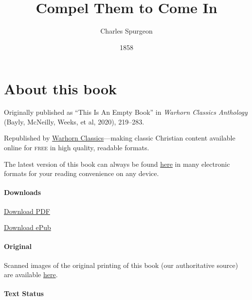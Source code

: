 \documentclass[
]{book}
\title{Compel Them to Come In}
\author{Charles Spurgeon}
\date{1858}
\begin{document}
\maketitle

\mainmatter
{}

{
\setcounter{tocdepth}{1}
\tableofcontents
}
\hypertarget{about-this-book}{%
\chapter*{About this book}\label{about-this-book}}

Originally published as ``This Is An Empty Book'' in \emph{Warhorn Classics Anthology} (Bayly, McNeilly, Weeks, et al, 2020), 219--283.

Republished by \href{https://classics.warhornmedia.com/}{Warhorn Classics}---making classic Christian content available online for \textsc{free} in high quality, readable formats.

The latest version of this book can always be found \href{https://warhornmedia.github.io/spurgeon-compel-them-to-come-in/}{here} in many electronic formats for your reading convenience on any device.

\hypertarget{downloads}{%
\subsubsection*{Downloads}\label{downloads}}

\href{https://warhornmedia.github.io/spurgeon-compel-them-to-come-in//Spurgeon-Compel_Them_to_Come_In.pdf}{Download PDF}

\href{https://warhornmedia.github.io/spurgeon-compel-them-to-come-in//Spurgeon-Compel_Them_to_Come_In.epub}{Download ePub}

\hypertarget{original}{%
\subsubsection*{Original}\label{original}}

Scanned images of the original printing of this book (our authoritative source) are available \href{https://www.spurgeongems.org/sermon/chs227.pdf}{here}.

\hypertarget{text-status}{%
\subsubsection*{Text Status}\label{text-status}}
\end{document}
